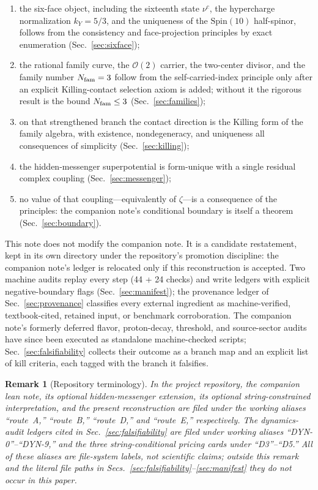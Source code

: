 \documentclass[
  aps,
  prd,
  preprint,
  nofootinbib,
  superscriptaddress,
  longbibliography
]{revtex4-2}
\newcommand{\Spin}{\mathrm{Spin}}
\newcommand{\cO}{\mathcal{O}}
\newtheorem{remark}[theorem]{Remark}
\begin{document}
\begin{enumerate}
\item the six-face object, including the sixteenth state \(\nu^c\), the
  hypercharge normalization \(k_Y=5/3\), and the uniqueness of the
  \(\Spin(10)\) half-spinor, follows from the consistency and
  face-projection principles by exact enumeration (Sec.~\ref{sec:sixface});
\item the rational family curve, the \(\cO(2)\) carrier, the two-center
  divisor, and the family number \(N_{\rm fam}=3\) follow from the
  self-carried-index principle only after an explicit Killing-contact
  selection axiom is added; without it the rigorous result is the bound
  \(N_{\rm fam}\le3\) (Sec.~\ref{sec:families});
\item on that strengthened branch the contact direction is the Killing form
  of the family algebra, with existence, nondegeneracy, and uniqueness all
  consequences of simplicity (Sec.~\ref{sec:killing});
\item the hidden-messenger superpotential is form-unique with a single
  residual complex coupling (Sec.~\ref{sec:messenger});
\item no value of that coupling---equivalently of \(\zeta\)---is a
  consequence of the principles: the companion note's conditional boundary
  is itself a theorem (Sec.~\ref{sec:boundary}).
\end{enumerate}

This note does not modify the companion note.  It is a candidate
restatement, kept in its own directory under the repository's promotion
discipline: the companion note's ledger is relocated only if this
reconstruction is accepted.  Two machine audits replay every step (44 + 24
checks) and write ledgers with explicit negative-boundary flags
(Sec.~\ref{sec:manifest}); the provenance ledger of
Sec.~\ref{sec:provenance} classifies every external ingredient as
machine-verified, textbook-cited, retained input, or benchmark
corroboration.  The companion note's formerly deferred flavor,
proton-decay, threshold, and source-sector audits have since been
executed as standalone machine-checked scripts;
Sec.~\ref{sec:falsifiability} collects their outcome as a branch map and
an explicit list of kill criteria, each tagged with the branch it
falsifies.

\begin{remark}[Repository terminology]
\label{rem:terminology}
In the project repository, the companion lean note, its optional
hidden-messenger extension, its optional string-constrained interpretation,
and the present reconstruction are filed under the working aliases
``route~A,'' ``route~B,'' ``route~D,'' and ``route~E,'' respectively.
The dynamics-audit ledgers cited in Sec.~\ref{sec:falsifiability} are
filed under working aliases ``DYN-0''--``DYN-9,'' and the three
string-conditional pricing cards under ``D3''--``D5.''  All of these
aliases are file-system labels, not scientific claims; outside this
remark and the literal file paths in
Secs.~\ref{sec:falsifiability}--\ref{sec:manifest} they do not occur in
this paper.
\end{remark}
\end{document}
